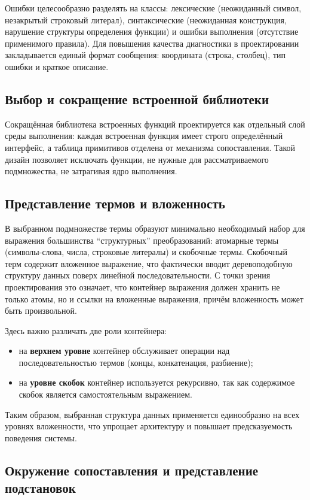 \documentclass[14pt, russian]{scrartcl}
\newcommand{\enq}[1]{\enquote{#1}}
\begin{document}
Ошибки целесообразно разделять на классы: лексические (неожиданный символ, незакрытый строковый литерал), синтаксические (неожиданная конструкция,
нарушение структуры определения функции) и ошибки выполнения (отсутствие применимого правила). Для повышения качества диагностики
в проектировании закладывается единый формат сообщения: координата (строка, столбец), тип ошибки и краткое описание.

\subsection{Выбор и сокращение встроенной библиотеки}

Сокращённая библиотека встроенных функций проектируется как отдельный слой среды выполнения: каждая встроенная функция имеет строго определённый
интерфейс, а таблица примитивов отделена от механизма сопоставления. Такой дизайн позволяет исключать функции, не нужные для рассматриваемого
подмножества, не затрагивая ядро выполнения.

\subsection{Представление термов и вложенность}

В выбранном подмножестве термы образуют минимально необходимый набор для выражения большинства \enq{структурных} преобразований:
атомарные термы (символы-слова, числа, строковые литералы) и скобочные термы. Скобочный терм содержит вложенное выражение, что фактически вводит
деревоподобную структуру данных поверх линейной последовательности. С точки зрения проектирования это означает, что контейнер выражения
должен хранить не только атомы, но и ссылки на вложенные выражения, причём вложенность может быть произвольной.

Здесь важно различать две роли контейнера:
\begin{itemize}
  \item на \textbf{верхнем уровне} контейнер обслуживает операции над последовательностью термов (концы, конкатенация, разбиение);
  \item на \textbf{уровне скобок} контейнер используется рекурсивно, так как содержимое скобок является самостоятельным выражением.
\end{itemize}
Таким образом, выбранная структура данных применяется единообразно на всех уровнях вложенности, что упрощает архитектуру и повышает
предсказуемость поведения системы.

\subsection{Окружение сопоставления и представление подстановок}
\end{document}
